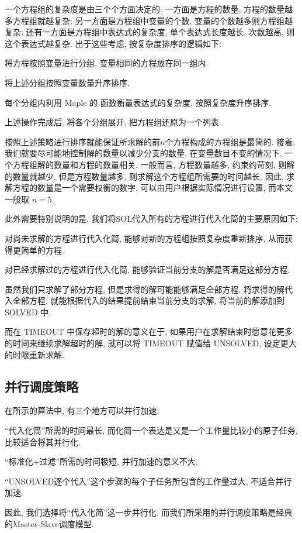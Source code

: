 一个方程组的复杂度是由三个个方面决定的: 一方面是方程的数量, 方程的数量越多方程组就越复杂; 另一方面是方程组中变量的个数, 变量的个数越多则方程组越复杂; 还有一方面是方程组中表达式的复杂度, 单个表达式长度越长, 次数越高, 则这个表达式越复杂. 出于这些考虑, 按复杂度排序的逻辑如下:
\begin{compactenum}[(1)]
\item 将方程按照变量进行分组, 变量相同的方程放在同一组内.
\item 将上述分组按照变量数量升序排序.
\item 每个分组内利用 Maple 的  函数衡量表达式的复杂度, 按照复杂度升序排序.  
\item 上述操作完成后, 将各个分组展开, 把方程组还原为一个列表. 
\end{compactenum}

按照上述策略进行排序就能保证所求解的前$n$个方程构成的方程组是最简的. 接着, 我们就要尽可能地控制解的数量以减少分支的数量. 在变量数目不变的情况下, 一个方程组解的数量和方程的数量相关. 一般而言, 方程数量越多, 约束约苛刻, 则解的数量就越少. 但是方程数量越多, 则求解这个方程组所需要的时间越长. 因此, 求解方程的数量是一个需要权衡的数字, 可以由用户根据实际情况进行设置, 而本文一般取 $n=5$.

此外需要特别说明的是, 我们将SOL代入所有的方程进行代入化简的主要原因如下: 
\begin{compactenum}[(1)]
\item 对尚未求解的方程进行代入化简, 能够对新的方程组按照复杂度重新排序, 从而获得更简单的方程.
\item 对已经求解过的方程进行代入化简, 能够验证当前分支的解是否满足这部分方程. 
\item 虽然我们只求解了部分方程, 但是求得的解可能能够满足全部方程. 将求得的解代入全部方程, 就能根据代入的结果提前结束当前分支的求解, 将当前的解添加到 SOLVED 中. 
\end{compactenum} 

而在 TIMEOUT 中保存超时的解的意义在于, 如果用户在求解结束时愿意花更多的时间来继续求解超时的解, 就可以将 TIMEOUT 赋值给 UNSOLVED, 设定更大的时限重新求解. 

\subsection{并行调度策略} 
在所示的算法中, 有三个地方可以并行加速:  
\begin{compactitem}[\textbullet]
\item ``代入化简''所需的时间最长, 而化简一个表达是又是一个工作量比较小的原子任务, 比较适合将其并行化.
\item ``标准化+过滤''所需的时间极短, 并行加速的意义不大.
\item ``UNSOLVED逐个代入''这个步骤的每个子任务所包含的工作量过大, 不适合并行加速.
\end{compactitem}
因此, 我们选择将``代入化简''这一步并行化. 而我们所采用的并行调度策略是经典的Master-Slave调度模型\cite{sahni1996master}. 

